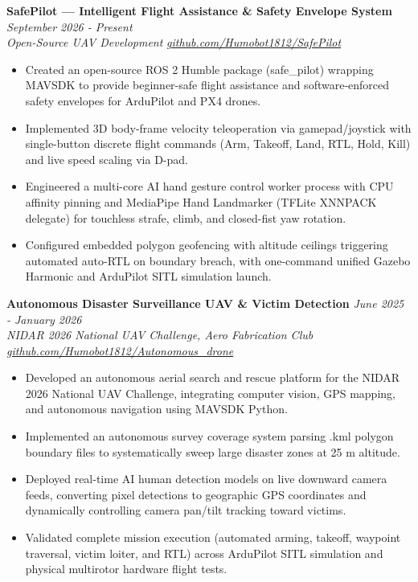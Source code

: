 \documentclass[10pt,a4paper]{article}
\begin{document}
\vspace{3pt}
\textbf{SafePilot — Intelligent Flight Assistance \& Safety Envelope System} \hfill \textit{September 2026 - Present}\\
\textit{Open-Source UAV Development} \hfill \textit{\href{https://github.com/Humobot1812/SafePilot}{github.com/Humobot1812/SafePilot}}
\begin{itemize}[leftmargin=1.2rem,itemsep=1.5pt,topsep=2pt,parsep=0pt]
  \item Created an open-source ROS 2 Humble package (safe\_pilot) wrapping MAVSDK to provide beginner-safe flight assistance and software-enforced safety envelopes for ArduPilot and PX4 drones.
  \item Implemented 3D body-frame velocity teleoperation via gamepad/joystick with single-button discrete flight commands (Arm, Takeoff, Land, RTL, Hold, Kill) and live speed scaling via D-pad.
  \item Engineered a multi-core AI hand gesture control worker process with CPU affinity pinning and MediaPipe Hand Landmarker (TFLite XNNPACK delegate) for touchless strafe, climb, and closed-fist yaw rotation.
  \item Configured embedded polygon geofencing with altitude ceilings triggering automated auto-RTL on boundary breach, with one-command unified Gazebo Harmonic and ArduPilot SITL simulation launch.
\end{itemize}

\vspace{3pt}
\textbf{Autonomous Disaster Surveillance UAV \& Victim Detection} \hfill \textit{June 2025 - January 2026}\\
\textit{NIDAR 2026 National UAV Challenge, Aero Fabrication Club} \hfill \textit{\href{https://github.com/Humobot1812/Autonomous_drone}{github.com/Humobot1812/Autonomous\_drone}}
\begin{itemize}[leftmargin=1.2rem,itemsep=1.5pt,topsep=2pt,parsep=0pt]
  \item Developed an autonomous aerial search and rescue platform for the NIDAR 2026 National UAV Challenge, integrating computer vision, GPS mapping, and autonomous navigation using MAVSDK Python.
  \item Implemented an autonomous survey coverage system parsing .kml polygon boundary files to systematically sweep large disaster zones at 25 m altitude.
  \item Deployed real-time AI human detection models on live downward camera feeds, converting pixel detections to geographic GPS coordinates and dynamically controlling camera pan/tilt tracking toward victims.
  \item Validated complete mission execution (automated arming, takeoff, waypoint traversal, victim loiter, and RTL) across ArduPilot SITL simulation and physical multirotor hardware flight tests.
\end{itemize}
\end{document}
